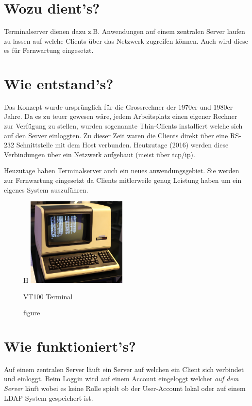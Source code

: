 \documentclass[11pt,twoside,a4paper]{article}
\title{\textbf{\titleText}}
\author{\authorText}
\date{\dateText}
\begin{document}
	\maketitle
	\tableofcontents
\clearpage
	\section{Wozu dient's?}
        \begin{multicols}{2}
          Terminalserver dienen dazu z.B. Anwendungen auf einem zentralen Server laufen zu lassen auf welche Clients über das Netzwerk zugreifen können. Auch wird diese es für Fernwartung eingesetzt. 
	\end{multicols}
	\section{Wie entstand's?}
	\begin{multicols}{2}
          Das Konzept wurde ursprünglich für die Grossrechner der 1970er und 1980er Jahre. Da es zu teuer gewesen wäre, jedem Arbeitsplatz einen eigener Rechner zur Verfügung zu stellen, wurden sogenannte Thin-Clients installiert welche sich auf den Server einloggten. Zu dieser Zeit waren die Clients direkt über eine RS-232 Schnittstelle mit dem Host verbunden. Heutzutage (2016) werden diese Verbindungen über ein Netzwerk aufgebaut (meist über tcp/ip). 

          Heuzutage haben Terminalserver auch ein neues anwendungsgebiet. Sie werden zur Fernwartung eingesetzt da Clients mitlerweile genug Leistung haben um ein eigenes System auszuführen. 
	\end{multicols}
          \begin{figure}{H}
            \centering
            \includegraphics[width=5cm]{terminal}
            \caption{figure}{VT100 Terminal}
          \end{figure}

	\section{Wie funktioniert's?}
	\begin{multicols}{2}
          Auf einem zentralen Server läuft ein Server auf welchen ein Client sich verbindet und einloggt. Beim Loggin wird auf einem Account eingeloggt welcher \textit{auf dem Server} läuft wobei es keine Rolle spielt ob der User-Account lokal oder auf einem LDAP System gespeichert ist. 
	\end{multicols}
        
\end{document}
